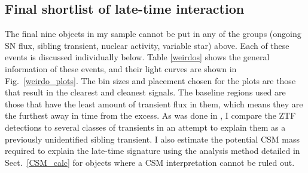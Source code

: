 \documentclass[a4paper,oneside,12pt, class=Latex/Classes/PhDthesisPSnPDF, crop=false]{standalone}
\begin{document}
\subsection{Final shortlist of late-time interaction}
\label{weirdo_section}
The final nine objects in my sample cannot be put in any of the groups (ongoing SN flux, sibling transient, nuclear activity, variable star) above. Each of these events is discussed individually below. Table \ref{weirdos} shows the general information of these events, and their light curves are shown in Fig.~\ref{weirdo_plots}. The bin sizes and placement chosen for the plots are those that result in the clearest and cleanest signals. The baseline regions used are those that have the least amount of transient flux in them, which means they are the furthest away in time from the excess. As was done in \citet{Terwel_2024_paper1}, I compare the ZTF detections to several classes of transients in an attempt to explain them as a previously unidentified sibling transient. I also estimate the potential CSM mass required to explain the late-time signature using the analysis method detailed in Sect.~\ref{CSM_calc} for objects where a CSM interpretation cannot be ruled out.\\
\end{document}
